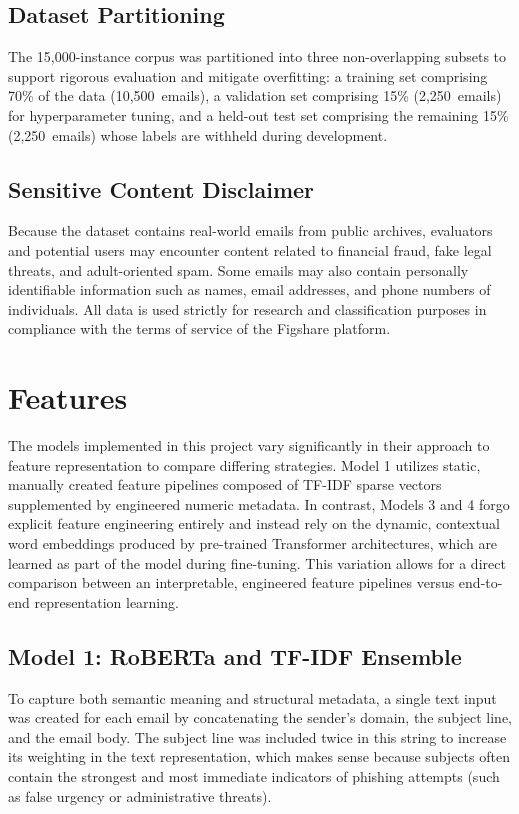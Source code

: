 \documentclass[11pt]{article}
\begin{document}
\subsection{Dataset Partitioning}
The 15,000-instance corpus was partitioned into three non-overlapping subsets to support rigorous evaluation and mitigate overfitting: a training set comprising 70\% of the data (10,500~emails), a validation set comprising 15\% (2,250~emails) for hyperparameter tuning, and a held-out test set comprising the remaining 15\% (2,250~emails) whose labels are withheld during development.

\subsection{Sensitive Content Disclaimer}
Because the dataset contains real-world emails from public archives, evaluators and potential users may encounter content related to financial fraud, fake legal threats, and adult-oriented spam. Some emails may also contain personally identifiable information such as names, email addresses, and phone numbers of individuals. All data is used strictly for research and classification purposes in compliance with the terms of service of the Figshare platform.

\section{Features}

The models implemented in this project vary significantly in their approach to feature representation to compare differing strategies. Model 1 utilizes static, manually created feature pipelines composed of TF-IDF sparse vectors supplemented by engineered numeric metadata. In contrast, Models 3 and 4 forgo explicit feature engineering entirely and instead rely on the dynamic, contextual word embeddings produced by pre-trained Transformer architectures, which are learned as part of the model during fine-tuning. This variation allows for a direct comparison between an interpretable, engineered feature pipelines versus end-to-end representation learning.

\subsection{Model 1: RoBERTa and TF-IDF Ensemble}
To capture both semantic meaning and structural metadata, a single text input was created for each email by concatenating the sender's domain, the subject line, and the email body. The subject line was included twice in this string to increase its weighting in the text representation, which makes sense because subjects often contain the strongest and most immediate indicators of phishing attempts (such as false urgency or administrative threats).
\end{document}
